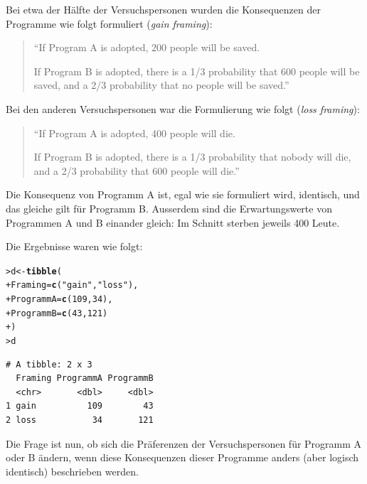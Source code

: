 \documentclass[oneside, 10pt]{book}\usepackage[]{graphicx}\usepackage[]{xcolor}
\makeatletter
\newcommand{\hlnum}[1]{\textcolor[rgb]{0.686,0.059,0.569}{#1}}%
\newcommand{\hlstr}[1]{\textcolor[rgb]{0.192,0.494,0.8}{#1}}%
\newcommand{\hlstd}[1]{\textcolor[rgb]{0.345,0.345,0.345}{#1}}%
\newcommand{\hlkwb}[1]{\textcolor[rgb]{0.69,0.353,0.396}{#1}}%
\newcommand{\hlkwc}[1]{\textcolor[rgb]{0.333,0.667,0.333}{#1}}%
\newcommand{\hlkwd}[1]{\textcolor[rgb]{0.737,0.353,0.396}{\textbf{#1}}}%
\newenvironment{kframe}{%
 \def\at@end@of@kframe{}%
 \ifinner\ifhmode%
  \def\at@end@of@kframe{\end{minipage}}%
  \begin{minipage}{\columnwidth}%
 \fi\fi%
 \def\FrameCommand##1{\hskip\@totalleftmargin \hskip-\fboxsep
 \colorbox{shadecolor}{##1}\hskip-\fboxsep
     \hskip-\linewidth \hskip-\@totalleftmargin \hskip\columnwidth}%
 \MakeFramed {\advance\hsize-\width
   \@totalleftmargin\z@ \linewidth\hsize
   \@setminipage}}%
 {\par\unskip\endMakeFramed%
 \at@end@of@kframe}
\newenvironment{knitrout}{}{} %
\makeatother
\begin{document}
Bei etwa der Hälfte der Versuchspersonen
wurden die Konsequenzen der Programme wie folgt
formuliert (\textit{gain framing}):
\begin{quote}
``If Program A is adopted, 200 people will be saved.

If Program B is adopted, there is a 1/3 probability
that 600 people will be saved, and a 2/3 probability
that no people will be saved.''
\end{quote}

Bei den anderen Versuchspersonen war die Formulierung wie
folgt (\textit{loss framing}):
\begin{quote}
``If Program A is adopted, 400 people will die.

If Program B is adopted, there is a 1/3 probability
that nobody will die, and a 2/3 probability
that 600 people will die.''
\end{quote}

Die Konsequenz von Programm A ist, egal wie
sie formuliert wird, identisch, und das gleiche gilt
für Programm B. Ausserdem sind die Erwartungswerte
von Programmen A und B einander gleich:
Im Schnitt sterben jeweils 400 Leute.

Die Ergebnisse waren wie folgt:
\begin{knitrout}
\color{fgcolor}\begin{kframe}
\begin{alltt}
\hlstd{> }\hlstd{d} \hlkwb{<-} \hlkwd{tibble}\hlstd{(}
\hlstd{+ }  \hlkwc{Framing} \hlstd{=} \hlkwd{c}\hlstd{(}\hlstr{"gain"}\hlstd{,} \hlstr{"loss"}\hlstd{),}
\hlstd{+ }  \hlkwc{ProgrammA} \hlstd{=} \hlkwd{c}\hlstd{(}\hlnum{109}\hlstd{,} \hlnum{34}\hlstd{),}
\hlstd{+ }  \hlkwc{ProgrammB} \hlstd{=} \hlkwd{c}\hlstd{(}\hlnum{43}\hlstd{,} \hlnum{121}\hlstd{)}
\hlstd{+ }\hlstd{)}
\hlstd{> }\hlstd{d}
\end{alltt}
\begin{verbatim}
# A tibble: 2 x 3
  Framing ProgrammA ProgrammB
  <chr>       <dbl>     <dbl>
1 gain          109        43
2 loss           34       121
\end{verbatim}
\end{kframe}
\end{knitrout}

Die Frage ist nun, ob sich die Präferenzen
der Versuchspersonen für Programm A oder B
ändern, wenn diese Konsequenzen dieser
Programme anders (aber logisch identisch)
beschrieben werden.
\end{document}
